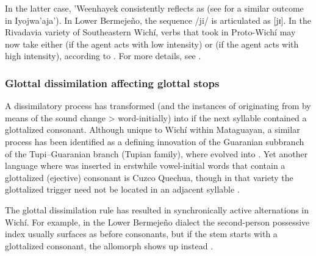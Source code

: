 \begin{exe}
    \ex \distrust
    \ex \saber
    \ex \gov
    \ex \pushv
\end{exe}

In the latter case, 'Weenhayek consistently reflects  as  (see  for a similar outcome in Iyojwa’aja’). In Lower Bermejeño, the sequence /ji/ is articulated as [jɪ]. In the Rivadavia variety of Southeastern Wichí, verbs that took  in Proto-Wichí may now take either  (if the agent acts with low intensity) or  (if the agent acts with high intensity), according to \citet[135]{JT09-th}. For more details, see .

\subsubsection{Glottal dissimilation affecting glottal stops}\label{wi-glottal-dissim}

A dissimilatory process has transformed  (and the instances of  originating from  by means of the sound change  >  word-initially) into  if the next syllable contained a glottalized consonant. Although unique to Wichí within Mataguayan, a similar process has been identified as a defining innovation of the Guaranian subbranch of the Tupi--Guaranian branch (Tupian family), where  evolved into  \citep{FC-guarani}. Yet another language where  was inserted in erstwhile vowel-initial words that contain a glottalized (ejective) consonant is Cuzco Quechua, though in that variety the glottalized trigger need not be located in an adjacent syllable \citep[170]{GP13}.

\begin{exe}
    \ex \jaguar
    \ex \vulture
    \ex \treen
    \ex \stretchout
    \ex \dividev
    \ex \cover
    \ex \suckcw
    \ex \seev
    \ex \aloja
    \ex \mancw
\end{exe}

The glottal dissimilation rule has resulted in synchronically active alternations in Wichí. For example, in the Lower Bermejeño dialect the second-person possessive index usually surfaces as  before consonants, but if the stem starts with a glottalized consonant, the allomorph  shows up instead .

